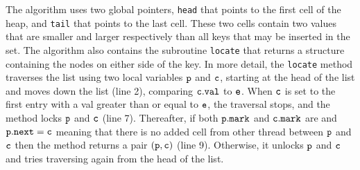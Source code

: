 % 
The algorithm uses two global pointers, {\tt head} that points to  the first cell of the heap, and {\tt tail} that points to the last cell.  
These two cells contain two values that are smaller 
and larger respectively than all keys that may be                     
inserted in the set. The algorithm also contains the subroutine {\tt locate} that returns a structure containing the nodes on either side of the key. In more detail, the {\tt locate} method traverses the list using two local variables ${\tt p}$ and $\tt c$, starting at the head of the list and moves down the list (line 2), comparing ${\tt c.val}$ to ${\tt e}$. When $\tt c$ is set to the
first entry with a val greater than or equal to $\tt e$, the traversal stops, and the
method locks $\tt p$ and $\tt c$ (line 7). Thereafter, if both $\tt p.mark$ and $\tt c.mark$ are \false \; and ${\tt p.next = c}$ meaning that there is no added cell from other thread between $\tt p$ and $\tt c$ then the method returns a pair $\tt (p,c)$ (line 9). Otherwise, it unlocks $\tt p$ and $\tt c$ and tries traversing again from the head of the list.


%

